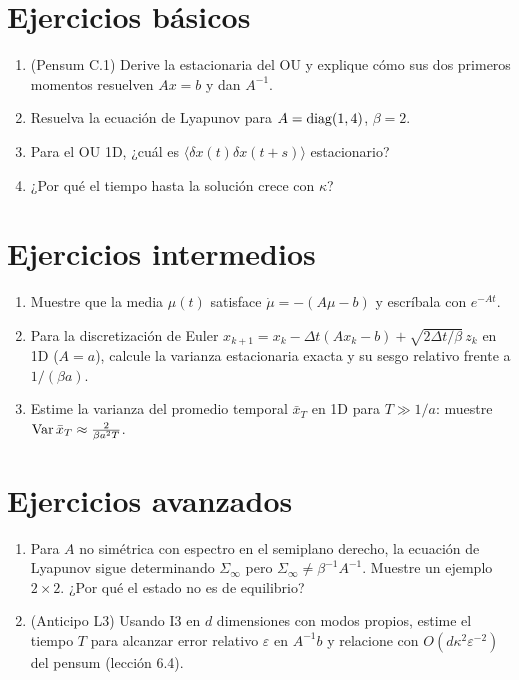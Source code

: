 \documentclass[11pt,a4paper]{article}
\begin{document}

\section{Ejercicios básicos}
\begin{enumerate}[label=\textbf{B\arabic*.}]
\item (Pensum C.1) Derive la estacionaria del OU y explique cómo sus dos primeros momentos resuelven $Ax=b$ y dan $A^{-1}$.
\item Resuelva la ecuación de Lyapunov para $A=\operatorname{diag}(1,4)$, $\beta=2$.
\item Para el OU 1D, ¿cuál es $\langle\delta x(t)\delta x(t+s)\rangle$ estacionario?
\item ¿Por qué el tiempo hasta la solución crece con $\kappa$?
\end{enumerate}

\section{Ejercicios intermedios}
\begin{enumerate}[label=\textbf{I\arabic*.}]
\item Muestre que la media $\mu(t)$ satisface $\dot\mu=-(A\mu-b)$ y escríbala con $e^{-At}$.
\item Para la discretización de Euler $x_{k+1}=x_k-\Delta t(Ax_k-b)+\sqrt{2\Delta t/\beta}\,z_k$ en 1D ($A=a$), calcule la varianza estacionaria exacta y su sesgo relativo frente a $1/(\beta a)$.
\item Estime la varianza del promedio temporal $\bar x_T$ en 1D para $T\gg1/a$: muestre $\operatorname{Var}\bar x_T\approx\frac{2}{\beta a^2T}$.
\end{enumerate}

\section{Ejercicios avanzados}
\begin{enumerate}[label=\textbf{A\arabic*.}]
\item Para $A$ no simétrica con espectro en el semiplano derecho, la ecuación de Lyapunov sigue determinando $\Sigma_\infty$ pero $\Sigma_\infty\neq\beta^{-1}A^{-1}$. Muestre un ejemplo $2\times2$. ¿Por qué el estado no es de equilibrio?
\item (Anticipo L3) Usando I3 en $d$ dimensiones con modos propios, estime el tiempo $T$ para alcanzar error relativo $\varepsilon$ en $A^{-1}b$ y relacione con $O(d\kappa^2\varepsilon^{-2})$ del pensum (lección 6.4).
\end{enumerate}
\end{document}
